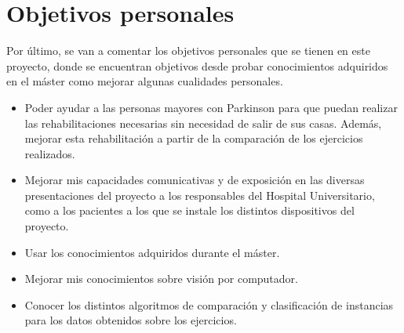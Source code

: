 \section{Objetivos personales}
Por último, se van a comentar los objetivos personales que se tienen en este proyecto, donde se encuentran objetivos desde probar conocimientos adquiridos en el máster como mejorar algunas cualidades personales.
\begin{itemize}
	\item Poder ayudar a las personas mayores con Parkinson para que puedan realizar las rehabilitaciones necesarias sin necesidad de salir de sus casas. Además, mejorar esta rehabilitación a partir de la comparación de los ejercicios realizados.
	\item Mejorar mis capacidades comunicativas y de exposición en las diversas presentaciones del proyecto a los responsables del Hospital Universitario, como a los pacientes a los que se instale los distintos dispositivos del proyecto.
	\item Usar los conocimientos adquiridos durante el máster.
	\item Mejorar mis conocimientos sobre visión por computador.
	\item Conocer los distintos algoritmos de comparación y clasificación de instancias para los datos obtenidos sobre los ejercicios.
\end{itemize} 

